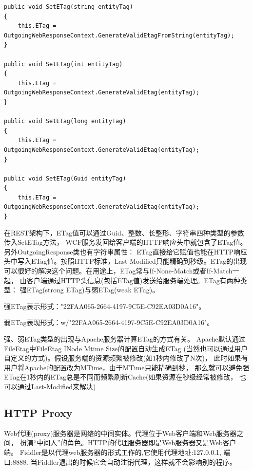 \documentclass{book}
\begin{document}
\begin{lstlisting}[language={[Sharp]C},caption=生成ETag,label={Code:GenerateETag}]
public void SetETag(string entityTag)
{
	this.ETag = OutgoingWebResponseContext.GenerateValidEtagFromString(entityTag);
}

public void SetETag(int entityTag)
{
	this.ETag = OutgoingWebResponseContext.GenerateValidEtag(entityTag);
}

public void SetETag(long entityTag)
{
	this.ETag = OutgoingWebResponseContext.GenerateValidEtag(entityTag);
}

public void SetETag(Guid entityTag)
{
	this.ETag = OutgoingWebResponseContext.GenerateValidEtag(entityTag);
}
\end{lstlisting}

在REST架构下，ETag值可以通过Guid、整数、长整形、字符串四种类型的参数传入SetETag方法，
WCF服务发回给客户端的HTTP响应头中就包含了ETag值。另外OutgoingResponse类也有字符串属性：
ETag直接给它赋值也能在HTTP响应头中写入ETag值。按照HTTP标准，Last-Modified只能精确到秒级。ETag的出现可以很好的解决这个问题。在用途上，ETag常与If-None-Match或者If-Match一起，
由客户端通过HTTP头信息(包括ETag值)发送给服务端处理。ETag有两种类型：
强ETag(strong ETag)与弱ETag(weak ETag)。

强ETag表示形式："22FAA065-2664-4197-9C5E-C92EA03D0A16"。

弱ETag表现形式：w/"22FAA065-2664-4197-9C5E-C92EA03D0A16"。

强、弱ETag类型的出现与Apache服务器计算ETag的方式有关。
Apache默认通过FileEtag中FileEtag INode Mtime Size的配置自动生成ETag
(当然也可以通过用户自定义的方式)。假设服务端的资源频繁被修改(如1秒内修改了N次)，
此时如果有用户将Apache的配置改为MTime，由于MTime只能精确到秒，
那么就可以避免强ETag在1秒内的ETag总是不同而频繁刷新Cache(如果资源在秒级经常被修改，
也可以通过Last-Modified来解决)

\subsection{HTTP Proxy}

Web代理(proxy)服务器是网络的中间实体。代理位于Web客户端和Web服务器之间，
扮演“中间人”的角色。HTTP的代理服务器即是Web服务器又是Web客户端。
Fiddler是以代理web服务器的形式工作的,它使用代理地址:127.0.0.1, 端口:8888.
当Fiddler退出的时候它会自动注销代理，这样就不会影响别的程序。
\end{document}
